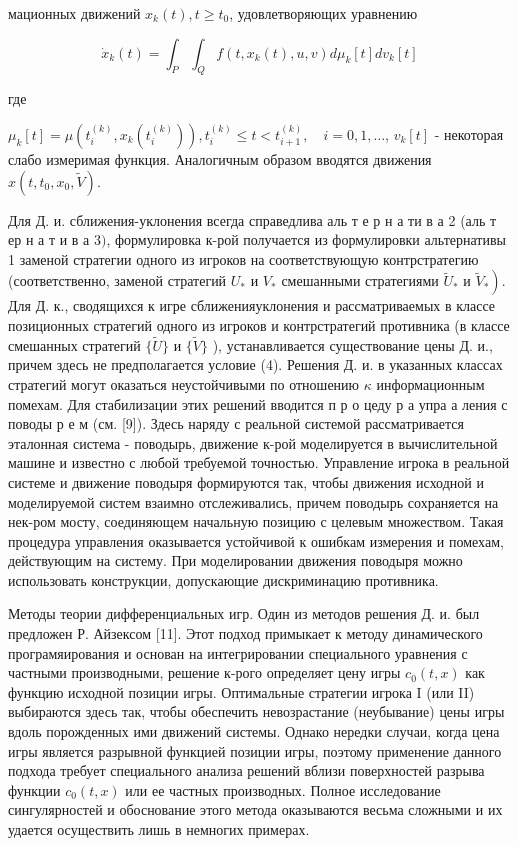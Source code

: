 \documentclass[10pt]{article}
\begin{document}
мационных движений $x_{k}(t), t \geqslant t_{0}$, удовлетворяющих уравнению



\[

\dot{x}_{k}(t)=\int_{P} \int_{Q} f\left(t, x_{k}(t), u, v\right) d \mu_{k}[t] d v_{k}[t]

\]



где



$\mu_{k}[t]=\mu\left(t_{i}^{(k)}, x_{k}\left(t_{i}^{(k)}\right)\right), t_{i}^{(k)} \leqslant t<t_{i+1}^{(k)}, \quad i=0,1, \ldots$, $v_{k}[t]$ - некоторая слабо измеримая функция. Аналогичным образом вводятся движения $x\left(t, t_{0}, x_{0}, \tilde{V}\right)$.



Для Д. и. сближения-уклонения всегда справедлива аль т е р н а ти в а 2 (аль т ер н а т и в а 3$)$, формулировка к-рой получается из формулировки альтернативы 1 заменой стратегии одного из игроков на соответствующую контрстратегию (соответственно, заменой стратегий $U_{*}$ и $V_{*}$ смешанными стратегиями $\tilde{U}_{*}$ и $\left.\tilde{V}_{*}\right)$. Для Д. к., сводящихся к игре сближенияуклонения и рассматриваемых в классе позиционных стратегий одного из игроков и контрстратегий противника (в классе смешанных стратегий $\{\tilde{U}\}$ и $\{\tilde{V}\}$ ), устанавливается существование цены Д. и., причем здесь не предполагается условие (4). Решения Д. и. в указанных классах стратегий могут оказаться неустойчивыми по отношению $\kappa$ информационным помехам. Для стабилизации этих решений вводится п р о цеду р а упра а ления с поводы р е м (см. [9]). Здесь наряду с реальной системой рассматривается эталонная система - поводырь, движение к-рой моделируется в вычислительной машине и известно с любой требуемой точностью. Управление игрока в реальной системе и движение поводыря формируются так, чтобы движения исходной и моделируемой систем взаимно отслеживались, причем поводырь сохраняется на нек-ром мосту, соединяющем начальную позицию с целевым множеством. Такая процедура управления оказывается устойчивой к ошибкам измерения и помехам, действующим на систему. При моделировании движения поводыря можно использовать конструкции, допускающие дискриминацию противника.



Методы теории дифференциальных игр. Один из методов решения Д. и. был предложен Р. Айзексом [11]. Этот подход примыкает к методу динамического програмяирования и основан на интегрировании специального уравнения с частными производными, решение к-рого определяет цену игры $c_{0}(t, x)$ как функцию исходной позиции игры. Оптимальные стратегии игрока I (или II) выбираются здесь так, чтобы обеспечить невозрастание (неубывание) цены игры вдоль порожденных ими движений системы. Однако нередки случаи, когда цена игры является разрывной функцией позиции игры, поэтому применение данного подхода требует специального анализа решений вблизи поверхностей разрыва функции $c_{0}(t, x)$ или ее частных производных. Полное исследование сингулярностей и обоснование этого метода оказываются весьма сложными и их удается осуществить лишь в немногих примерах.
\end{document}
